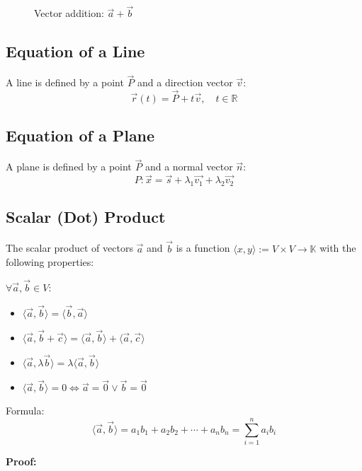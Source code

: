 \begin{figure}[h!]
	\centering
	\caption{Vector addition: \(\vec{a} + \vec{b}\)}
\end{figure}

\subsection{Equation of a Line}
A line is defined by a point \(\vec{P}\) and a direction vector \(\vec{v}\):
\[
	\vec{r}(t) = \vec{P} + t\vec{v}, \quad t \in \mathbb{R}
\]

\subsection{Equation of a Plane}
A plane is defined by a point \(\vec{P}\) and a normal vector \(\vec{n}\):
\[
	P: \vec{x} = \vec{s} + \lambda_1 \vec{v_1} + \lambda_2 \vec{v_2}
\]
\subsection{Scalar (Dot) Product}
The scalar product of vectors \(\vec{a}\) and \(\vec{b}\) is a function \(\langle x, y\rangle :=V \times V \rightarrow \mathbb{K}\)
with the following properties:

\(\forall \vec{a}, \vec{b} \in V\):
\begin{itemize}[label=\(-\)]
	\item \(\langle\vec{a}, \vec{b}\rangle = \langle\vec{b}, \vec{a}\rangle \)
	\item \(\langle\vec{a}, \vec{b} + \vec{c}\rangle = \langle\vec{a}, \vec{b}\rangle + \langle\vec{a}, \vec{c}\rangle\)
	\item \(\langle\vec{a}, \lambda \vec{b}\rangle = \lambda \langle\vec{a}, \vec{b}\rangle\)
	\item \(\langle\vec{a}, \vec{b}\rangle = 0 \Leftrightarrow \vec{a} = \vec{0} \vee \vec{b} = \vec{0}\)
\end{itemize}

 Formula:
\[
	\langle\vec{a}, \vec{b}\rangle = a_1 b_1 + a_2 b_2 + \cdots + a_n b_n = \sum_{i = 1}^{n} a_i b_i
\]

\textbf{Proof:}

